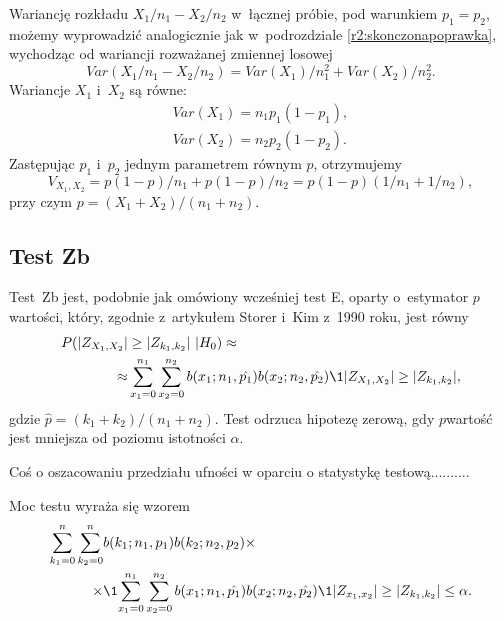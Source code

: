Wariancję rozkładu $X_1/n_1-X_2/n_2$ w~łącznej próbie, pod warunkiem $p_1=p_2$, możemy wyprowadzić analogicznie jak w~podrozdziale \ref{r2:skonczonapoprawka}, wychodząc od wariancji rozważanej zmiennej losowej
\begin{equation}
Var(X_1/n_1-X_2/n_2) = Var(X_1)/n_1^2+Var(X_2)/n_2^2.
\end{equation}
Wariancje $X_1$ i~$X_2$ są równe:
\begin{align}
Var(X_1)=n_1 p_1 (1-p_1),\\
Var(X_2)=n_2 p_2 (1-p_2).
\end{align}
Zastępując $p_1$ i~$p_2$ jednym parametrem równym $p$, otrzymujemy
\begin{equation}
V_{X_1,X_2} = p(1-p)/n_1 + p(1-p)/n_2 = p(1-p)(1/n_1+1/n_2),
\end{equation}
przy czym $p=(X_1+X_2)/(n_1+n_2)$.

\subsection{Test Zb}

Test~Zb jest, podobnie jak omówiony wcześniej test E, oparty o~estymator $p$\dywiz wartości, który, zgodnie z~artykułem Storer i~Kim z~1990 roku, jest równy~\cite{Storer1990}
\begin{equation}
\begin{split}
P(|Z_{X_1,X_2}|&\geq|Z_{k_1,k_2}|\ |H_0) \approx \\
\approx & \sum_{x_1=0}^{n_1}\sum_{x_2=0}^{n_2} b(x_1;n_1,\hat{p_1})b(x_2;n_2,\hat{p_2})\1{|Z_{X_1,X_2}|\geq|Z_{k_1,k_2}|},
\end{split}
\end{equation}
gdzie $\hat{p}=(k_1+k_2)/(n_1+n_2)$.
Test odrzuca hipotezę zerową, gdy $p$\dywiz wartość jest mniejsza od poziomu istotności $\alpha$.

Coś o oszacowaniu przedziału ufności w oparciu o statystykę testową..........

Moc testu wyraża się wzorem
\begin{equation}
\begin{split}
\sum_{k_1=0}^{n}\sum_{k_2=0}^{n}& b(k_1;n_1,p_1)b(k_2;n_2,p_2) \times \\
\times &\1{\sum_{x_1=0}^{n_1} \sum_{x_2=0}^{n_2} b(x_1;n_1,\hat{p_1}) b(x_2;n_2,\hat{p_2}) \1{|Z_{x_1,x_2}|\geq|Z_{k_1,k_2}|} \leq\alpha}.
\end{split}
\end{equation}

